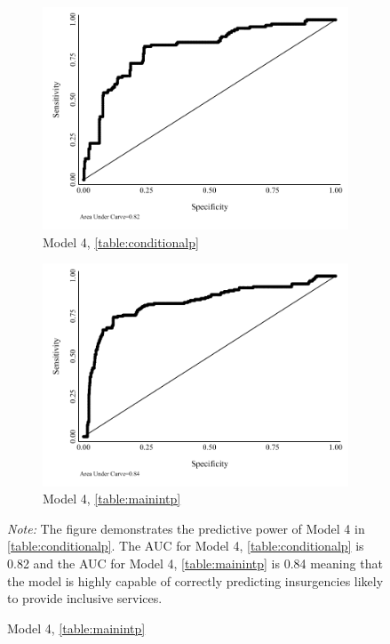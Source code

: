 \documentclass[12pt, letterpaper]{article}
\begin{document}
\begin{figure}[h]
\renewcommand\thefigure{A.\arabic{figure}}
\caption{\textbf{ROC Curves of Predicted Accuracy}}
\label{figure:roccurvep}
\centering
	\begin{subfigure}{0.45\textwidth}
    \centering
    \caption{Model 4, \autoref{table:conditionalp}} \label{figure:roccurve1p}
    \includegraphics[width=\textwidth]{roccurve1p.pdf}
    \end{subfigure}
% 
	\begin{subfigure}{0.45\textwidth}
    \centering
    \caption{Model 4, \autoref{table:mainintp}} \label{figure:roccurve2p}
    \includegraphics[width=\textwidth]{roccurve2p.pdf}
    \end{subfigure}
  \begin{tablenotes}
\raggedright \footnotesize{\textit{Note:} The figure demonstrates the predictive power of Model 4 in  \autoref{table:conditionalp}. The AUC for Model 4, \autoref{table:conditionalp} is 0.82 and the AUC for Model 4, \autoref{table:mainintp} is 0.84 meaning that the model is highly capable of correctly predicting insurgencies likely to provide inclusive services.}
\end{tablenotes}
\end{figure}
\end{document}
